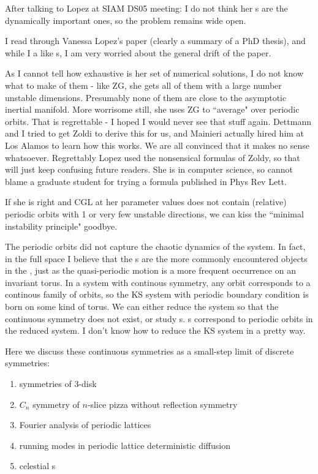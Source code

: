 After talking to Lopez at SIAM DS05 meeting: I do not think
her \rpo s are the dynamically important ones, so the problem remains wide open.

I read through
Vanessa Lopez's paper (clearly a summary of a PhD thesis), and while I
a like {\rpo s}, I am very worried about the general drift
of the paper.

As I cannot tell how exhaustive is her set of numerical solutions, I do
not know what to make of them - like ZG, she gets all of them with a large
number unstable dimensions. Presumably none of them are close to the
asymptotic inertial manifold. More worrisome still, she uses ZG to
``average" over periodic orbits. That is regrettable - I hoped I would
never see that stuff again. Dettmann and I tried to get Zoldi to
derive this for us, and Mainieri actually hired him at Los Alamos to learn
how this works. We are all convinced that it makes no sense whatsoever.
Regrettably Lopez used the nonsensical formulas of Zoldy, so that will
just keep confusing future readers.
She is in computer science, so cannot
blame a graduate student for trying a formula published in Phys Rev Lett.


If she is right and CGL at her parameter values does not contain
(relative) periodic orbits with 1 or very few unstable directions, we can
kiss the ``minimal instability principle" goodbye.

The
periodic orbits
did not capture the chaotic dynamics of the system. In fact, in the full
space I believe that the {\rpo s} are the more commonly
encountered objects in the \statesp, just as the quasi-periodic motion is a
more frequent occurrence on an invariant torus. In a system with continous
symmetry, any orbit corresponds to a continous family of orbits, so the KS
system with periodic boundary condition is born on some kind of torus. We can
either reduce the system so that the continuous symmetry does not exist, or
study {\rpo s}. {\Rpo s} correspond to periodic
orbits in the reduced system. I don't know how to reduce the KS system in a
pretty way.


        Here we discuss these continuous symmetries as
a small-step limit of discrete symmetries:

\begin{enumerate}
\item
        symmetries of 3-disk
\item
        $C_n$ symmetry of $n$-slice pizza without reflection symmetry
\item
        Fourier analysis of periodic lattices
\item
        running modes in periodic lattice deterministic
           diffusion
\item
    celestial {\rpo s}
\end{enumerate}

